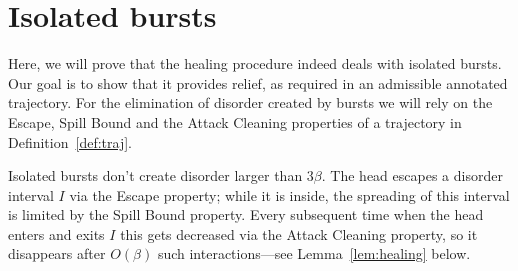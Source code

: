 \documentclass[11pt]{memoir}
\newcommand{\authnote}[3]
{\text{{ \textcolor{#3}{\( \langle\hspace{-0.2em}\langle \)\textsf{\footnotesize #1: #2}\( \rangle\hspace{-0.2em}\rangle \)}}}}
\newcommand{\authnote}[2]{}
\newcommand{\Pnote}[1]{{\authnote{P}{#1}{cyan}}}
\theoremstyle{definition} %
\newtheorem{Premark}{\color{cyan}Peter remark}
\newenvironment{premark}{\begin{Premark}\color{cyan}}{\varqed\end{Premark}}
\renewcommand{\Pnote}[1]{\begin{premark}#1\end{premark}}
\def\B{B}
\newcommand{\Tu}{T}
\newcommand{\Z}{Z}
\newcommand{\cns}[1]{c_{\textrm{\upshape #1}}}
\newcommand{\CAtt}{\cns{attack}}
\newcommand{\CEsc}{\cns{esc}}
\newcommand{\CSpill}{\cns{spill}}
\begin{document}


\section{Isolated bursts}\label{sec:1-level-noise}

Here, we will prove that the healing procedure indeed deals with isolated bursts.
Our goal is to show that it provides relief, as required in an
admissible annotated trajectory.
For the elimination of disorder created by bursts
we will rely on the Escape, Spill Bound and the Attack Cleaning
properties of a trajectory in Definition~\ref{def:traj}.

Isolated bursts don't create disorder larger than \( 3\beta \).
The head escapes a disorder interval \( I \) via the Escape property; while it is inside, the
spreading of this interval is limited by the Spill Bound property.
Every subsequent time when the head enters and exits \( I \) this gets decreased
via the Attack Cleaning property, so it disappears after \( O(\beta) \) such interactions---see
Lemma~\ref{lem:healing} below.

 
\end{document}
